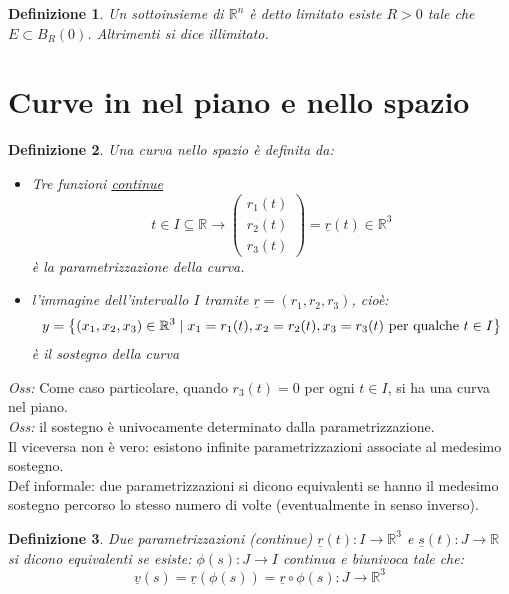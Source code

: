 \documentclass{scrreprt}
\newtheorem{defn}{Definizione}
\newenvironment{definition}{\begin{mdframed}[backgroundcolor=Ivory2]\begin{defn}}{\end{defn}\end{mdframed}}
\begin{document}
\begin{definition}
	Un sottoinsieme di $\mathbb{R}^n$ è detto limitato esiste $R>0$ tale che $E\subset B_R(0)$. Altrimenti si dice illimitato. %
\end{definition}


\section{Curve in nel piano e nello spazio}
\begin{definition}
	Una curva nello spazio è definita da:
	\begin{itemize}
		\item Tre funzioni \underline{continue}
				\begin{equation}
					t \in I \subseteq \mathbb{R} \longrightarrow  \left(\begin{array}{c} r_1(t)\\ r_2(t)\\ r_3(t) \end{array}\right)   = \underline{r}(t) \in \mathbb{R}^3
				\end{equation}
				è la parametrizzazione della curva.
		\item l'immagine dell'intervallo $I$ tramite $\underline{r}= ( r_1, r_2, r_3 )$, cioè:
				\begin{equation}
					y = \left\{ (x_1,x_2,x_3) \in \mathbb{R}^3 \mid x_1 = r_1(t), x_2 = r_2(t), x_3 = r_3(t) \textnormal{ per qualche } t \in I \right\}
				\end{equation}
				è il sostegno della curva
	\end{itemize}
\end{definition}
\emph{Oss:} Come caso particolare, quando $r_3(t)=0$ per ogni $t\in I$, si ha una curva nel piano.\\


\emph{Oss:} il sostegno è univocamente determinato dalla parametrizzazione.\\
Il viceversa non è vero: esistono infinite parametrizzazioni associate al medesimo sostegno.\\

Def informale: due parametrizzazioni si dicono equivalenti se hanno il medesimo sostegno percorso lo stesso numero di volte (eventualmente in senso inverso).\\

\begin{definition}
	Due parametrizzazioni (continue) $\underline{r}(t): I \rightarrow \mathbb{R}^3$ e $\underline{s}(t): J \rightarrow \mathbb{R}$ si dicono equivalenti se esiste: $\phi (s): J \rightarrow I$ continua e biunivoca tale che:
	\begin{equation}
		\underline{v}(s) = \underline{r}(\phi(s)) = \underline{r} \circ \phi(s): J \rightarrow \mathbb{R}^3
	\end{equation}
\end{definition}
\end{document}

